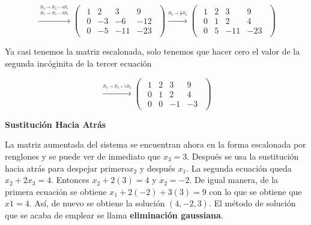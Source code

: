 \documentclass{article}
\begin{document}
\begin{equation*}
    \xrightarrow{\overset{\begin{aligned} R_2 \rightarrow R_2 - 4R_1 \\ R_3 \rightarrow R_3 - 3R_1\end{aligned}}{}} 
    \begin{pmatrix}
        \begin{array}{rrr|r}
            1& 2 & 3 & 9\\
            0 &-3 &-6 &-12 \\
            0&-5 &-11 &-23
        \end{array}
    \end{pmatrix}
    \xrightarrow{\stackrel{R_2 \rightarrow \frac{1}{3}R_2}{}}
    \begin{pmatrix}
        \begin{array}{rrr|r}
            1 & 2 & 3 & 9\\
            0 & 1 & 2 & 4\\
            0 & 5 &-11&-23
        \end{array}
    \end{pmatrix}
\end{equation*}

\pagebreak

Ya casi tenemos la matriz escalonada, solo tenemos que hacer cero el valor de la segunda incóginita de la tercer ecuación

\begin{equation*}
    \xrightarrow{\overset{R_3 \rightarrow R_3 + 5R_2}{}} 
    \begin{pmatrix}
        \begin{array}{rrr|r}
            1 & 2 & 3 & 9\\
            0 & 1 & 2 & 4 \\
            0 & 0 &-1 &-3
        \end{array}
    \end{pmatrix}
\end{equation*}

\begin{large}
    \textbf{Sustitución Hacia Atrás}
\end{large}

La matriz aumentada del sistema se encuentran ahora en la forma escalonada por renglones y se puede ver de inmediato que $x_3 = 3$. Después se usa la sustitución hacia atrás para despejar primero$x_2$ y después $x_1$. La segunda ecuación queda $x_2 + 2x_3 = 4$. Entonces $x_2 + 2(3) = 4$ y $x_2 =-2$. De igual manera, de la primera ecuación se obtiene $x_1 + 2(-2) + 3(3) = 9$  con lo que se obtiene que $x1 = 4$. Así, de nuevo se obtiene la solución $(4, -2, 3)$. El método de solución que se acaba de emplear se llama \textbf{eliminación gaussiana}.
\end{document}
